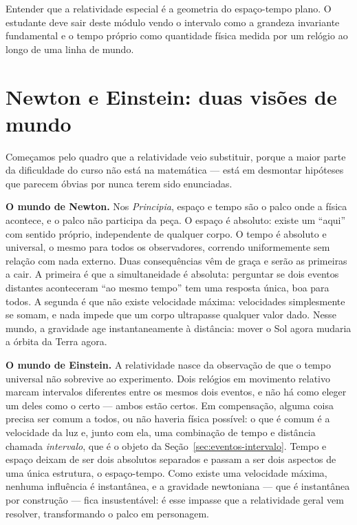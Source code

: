 \documentclass[12pt,a4paper,oneside]{book}
\theoremstyle{rgplain}
\theoremstyle{rgremark}
\begin{document}
\begin{objetivos}
Entender que a relatividade especial é a geometria do espaço-tempo plano.
O estudante deve sair deste módulo vendo o intervalo como a grandeza
invariante fundamental e o tempo próprio como quantidade física medida por
um relógio ao longo de uma linha de mundo.
\end{objetivos}

\section{Newton e Einstein: duas visões de mundo}
\label{sec:galileu}

Começamos pelo quadro que a relatividade veio substituir, porque a maior
parte da dificuldade do curso não está na matemática --- está em desmontar
hipóteses que parecem óbvias por nunca terem sido enunciadas.

\textbf{O mundo de Newton.} Nos \textit{Principia}, espaço e tempo são o palco
onde a física acontece, e o palco não participa da peça. O espaço é absoluto:
existe um ``aqui'' com sentido próprio, independente de qualquer corpo. O
tempo é absoluto e universal, o mesmo para todos os observadores, correndo
uniformemente sem relação com nada externo. Duas consequências vêm de graça e
serão as primeiras a cair. A primeira é que a simultaneidade é absoluta:
perguntar se dois eventos distantes aconteceram ``ao mesmo tempo'' tem uma
resposta única, boa para todos. A segunda é que não existe velocidade máxima:
velocidades simplesmente se somam, e nada impede que um corpo ultrapasse
qualquer valor dado. Nesse mundo, a gravidade age instantaneamente à
distância: mover o Sol agora mudaria a órbita da Terra agora.

\textbf{O mundo de Einstein.} A relatividade nasce da observação de que o
tempo universal não sobrevive ao experimento. Dois relógios em movimento
relativo marcam intervalos diferentes entre os mesmos dois eventos, e não há
como eleger um deles como o certo --- ambos estão certos. Em compensação,
alguma coisa precisa ser comum a todos, ou não haveria física possível: o que
é comum é a velocidade da luz e, junto com ela, uma combinação de tempo e
distância chamada \emph{intervalo}, que é o objeto da
Seção~\ref{sec:eventos-intervalo}. Tempo e espaço deixam de ser dois absolutos
separados e passam a ser dois aspectos de uma única estrutura, o espaço-tempo.
Como existe uma velocidade máxima, nenhuma influência é instantânea, e a
gravidade newtoniana --- que é instantânea por construção --- fica insustentável:
é esse impasse que a relatividade geral vem resolver, transformando o palco em
personagem.
\end{document}
